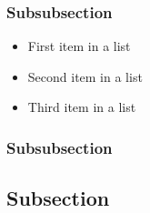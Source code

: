 \documentclass[fleqn,10pt]{SelfArx} %
\begin{document}
	\subsubsection{Subsubsection}
	
	\lipsum[13] %
	
	\begin{itemize}[noitemsep] %
		\item First item in a list
		\item Second item in a list
		\item Third item in a list
	\end{itemize}
	
	\subsubsection{Subsubsection}
	
	\lipsum[14] %
	
	\subsection{Subsection}
	
	\lipsum[15-23] %
	
\end{document}
